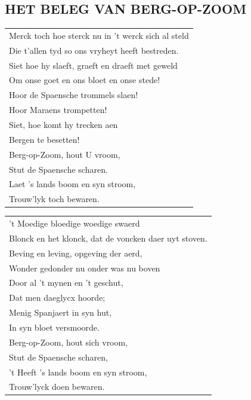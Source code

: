 \documentclass{article}
\begin{document}
\subsection*{HET BELEG VAN BERG-OP-ZOOM}
\begin{flushleft}
\begin{tabularx}{0.8\textwidth} {
   >{\raggedright\arraybackslash}X}
   Merck toch hoe sterck nu in ’t werck sich al steld\\
Die t’allen tyd so ons vryheyt heeft bestreden.\\
Siet hoe hy slaeft, graeft en draeft met geweld\\
Om onse goet en ons bloet en onse stede!\\
Hoor de Spaensche trommels slaen!\\
Hoor Maraens trompetten!\\
Siet, hoe komt hy trecken aen\\
Bergen te besetten!\\
Berg-op-Zoom, hout U vroom,\\
Stut de Spaensche scharen.\\
Laet ’s lands boom en syn stroom,\\
Trouw’lyk toch bewaren.\\
\end{tabularx}
\end{flushleft}\begin{flushleft}
\begin{tabularx}{0.9\textwidth} {
   >{\raggedright\arraybackslash}X}
   ’t Moedige bloedige woedige swaerd\\
Blonck en het klonck, dat de voncken daer uyt stoven.\\
Beving en leving, opgeving der aerd,\\
Wonder gedonder nu onder was nu boven\\
Door al ’t mynen en ’t geschut,\\
Dat men daeglycx hoorde;\\
Menig Spanjaert in syn hut,\\
In syn bloet versmoorde.\\
Berg-op-Zoom, hout sich vroom,\\
Stut de Spaensche scharen,\\
’t Heeft ’s lands boom en syn stroom,\\
Trouw’lyck doen bewaren.\\
\end{tabularx}
\end{flushleft}\begin{flushleft}

\end{flushleft}
\end{document}
